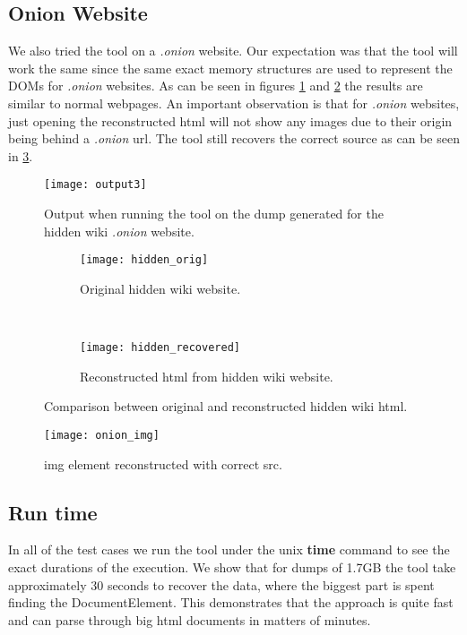 \subsection{Onion Website}
We also tried the tool on a \textit{.onion} website. Our expectation was that the tool will work the same since the same exact memory structures are used to represent the DOMs for \textit{.onion} websites. As can be seen in figures \ref{img:output3} and \ref{fig:hidden_compare} the results are similar to normal webpages. An important observation is that for \textit{.onion} websites, just opening the reconstructed html will not show any images due to their origin being behind a \textit{.onion} url. The tool still recovers the correct source as can be seen in \ref{img:onion_img}.

\begin{figure}[h]
	\centering
	\texttt{[image: output3]}
	\caption{Output when running the tool on the dump generated for the hidden wiki \textit{.onion} website.}
	\label{img:output3}
\end{figure}

\begin{figure}[H]
	\begin{subfigure}{\linewidth}
		\centering
		\texttt{[image: hidden\_orig]}
		\caption{Original hidden wiki website.}
	\end{subfigure}\\[1ex]

	\begin{subfigure}{\linewidth}
		\centering
		\texttt{[image: hidden\_recovered]}
		\caption{Reconstructed html from hidden wiki website.}
	\end{subfigure}
	\caption{Comparison between original and reconstructed hidden wiki html.}
	\label{fig:hidden_compare}
\end{figure}

\begin{figure}[H]
	\centering
	\texttt{[image: onion\_img]}
	\caption{img element reconstructed with correct src.}
	\label{img:onion_img}
\end{figure}

\subsection{Run time}
In all of the test cases we run the tool under the unix \textbf{time} command to see the exact durations of the execution. We show that for dumps of 1.7GB the tool take approximately 30 seconds to recover the data, where the biggest part is spent finding the DocumentElement. This demonstrates that the approach is quite fast and can parse through big html documents in matters of minutes.
